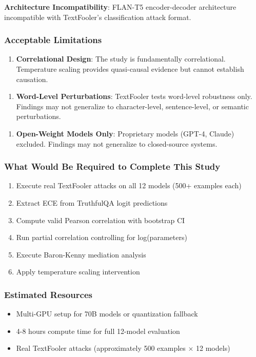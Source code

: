 \textbf{Architecture Incompatibility}: FLAN-T5 encoder-decoder architecture incompatible with TextFooler's classification attack format.

\subsubsection{Acceptable Limitations}

\begin{enumerate}
\item \textbf{Correlational Design}: The study is fundamentally correlational. Temperature scaling provides quasi-causal evidence but cannot establish causation.
\end{enumerate}

\begin{enumerate}
\item \textbf{Word-Level Perturbations}: TextFooler tests word-level robustness only. Findings may not generalize to character-level, sentence-level, or semantic perturbations.
\end{enumerate}

\begin{enumerate}
\item \textbf{Open-Weight Models Only}: Proprietary models (GPT-4, Claude) excluded. Findings may not generalize to closed-source systems.
\end{enumerate}

\subsubsection{What Would Be Required to Complete This Study}

\begin{enumerate}
\item Execute real TextFooler attacks on all 12 models (500+ examples each)
\item Extract ECE from TruthfulQA logit predictions
\item Compute valid Pearson correlation with bootstrap CI
\item Run partial correlation controlling for log(parameters)
\item Execute Baron-Kenny mediation analysis
\item Apply temperature scaling intervention
\end{enumerate}

\subsubsection{Estimated Resources}

\begin{itemize}
\item Multi-GPU setup for 70B models or quantization fallback
\item 4-8 hours compute time for full 12-model evaluation
\item Real TextFooler attacks (approximately 500 examples $\times$ 12 models)
\end{itemize}

